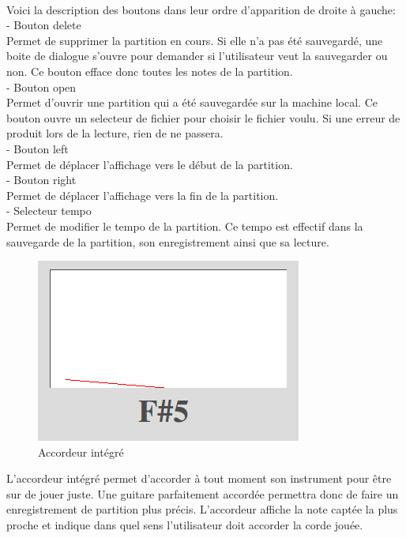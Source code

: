 \paragraph{}
Voici la description des boutons dans leur ordre d'apparition de droite à gauche:\\
- Bouton delete\\
Permet de supprimer la partition en cours. Si elle n'a pas été sauvegardé, une boite de dialogue s'ouvre pour demander si l'utilisateur 
veut la sauvegarder ou non. Ce bouton efface donc toutes les notes de la partition.\\
- Bouton open\\
Permet d'ouvrir une partition qui a été sauvegardée sur la machine local. Ce bouton ouvre un selecteur de fichier pour choisir le fichier 
voulu. Si une erreur de produit lors de la lecture, rien de ne passera.\\
- Bouton left\\
Permet de déplacer l'affichage vers le début de la partition.\\
- Bouton right\\
Permet de déplacer l'affichage vers la fin de la partition.\\
- Selecteur tempo\\
Permet de modifier le tempo de la partition. Ce tempo est effectif dans la sauvegarde de la partition, son enregistrement ainsi que sa lecture.
\begin{figure}[H]
\centering
\includegraphics[scale=0.5]{Tuner}
\caption{Accordeur intégré}
\end{figure}
L'accordeur intégré permet d'accorder à tout moment son instrument pour être sur de jouer juste. Une guitare parfaitement accordée permettra donc 
de faire un enregistrement de partition plus précis. L'accordeur affiche la note captée la plus proche et indique dans quel sens l'utilisateur 
doit accorder la corde jouée.

